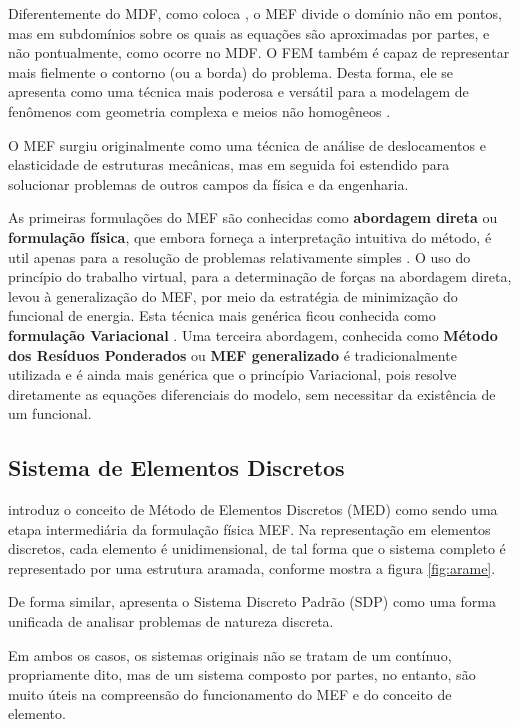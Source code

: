 Diferentemente do MDF, como coloca \citep[p. 4]{huebner}, o MEF divide o domínio não em pontos, mas em subdomínios sobre os quais as equações são aproximadas por partes, e não pontualmente, como ocorre no MDF. O FEM também é capaz de representar mais fielmente o contorno (ou a borda) do problema. Desta forma, ele se apresenta como uma técnica mais poderosa e versátil para a modelagem de fenômenos com geometria complexa e meios não homogêneos \citep[p. 390]{sadiku}. 

O MEF surgiu originalmente como uma técnica de análise de deslocamentos e elasticidade de estruturas mecânicas, mas em seguida foi estendido para solucionar problemas de outros campos da física e da engenharia. \citep[p. 19]{jin} \citep[p. 3]{desai} \citep[p. 2]{zien}

As primeiras formulações do MEF são conhecidas como \textbf{abordagem direta} ou \textbf{formulação física}, que embora forneça a interpretação intuitiva do método, é util apenas para a resolução de problemas relativamente simples \citep[p. 6]{huebner}. O uso do princípio do trabalho virtual, para a determinação de forças na abordagem direta, levou à generalização do MEF, por meio da estratégia de minimização do funcional de energia. Esta técnica mais genérica  ficou conhecida como \textbf{formulação Variacional} \citep[p. 113]{desai} \citep[p. 20]{zien}. Uma terceira abordagem, conhecida como \textbf{Método dos Resíduos Ponderados} ou \textbf{MEF generalizado} \citep[p. 61]{zien} é tradicionalmente utilizada e é ainda mais genérica que o princípio Variacional, pois resolve diretamente as equações diferenciais do modelo, sem necessitar da existência de um funcional. \citep[p. 261]{desai}


\subsection{Sistema de Elementos Discretos}
\citep[p. 68]{desai} introduz o conceito de Método de Elementos Discretos (MED) como sendo uma etapa intermediária da formulação física MEF. Na representação em elementos discretos, cada elemento é unidimensional, de tal forma que o sistema completo é representado por uma estrutura aramada, conforme mostra a figura \ref{fig:arame}.

De forma similar, \citep[p. 2]{zien} apresenta o Sistema Discreto Padrão (SDP) como uma forma unificada de analisar problemas de natureza discreta.

Em ambos os casos, os sistemas originais não se tratam de um contínuo, propriamente dito, mas de um sistema composto por partes, no entanto, são muito úteis na compreensão do funcionamento do MEF e do conceito de elemento.


